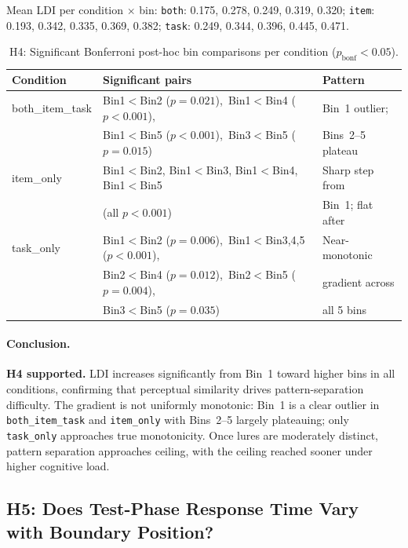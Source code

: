 \documentclass[10pt,a4paper]{article}
\begin{document}
Mean LDI per condition $\times$ bin: \texttt{both}: 0.175, 0.278, 0.249, 0.319, 0.320; \texttt{item}: 0.193, 0.342, 0.335, 0.369, 0.382; \texttt{task}: 0.249, 0.344, 0.396, 0.445, 0.471.

\begin{table}[H]
\centering
\caption{H4: Significant Bonferroni post-hoc bin comparisons per condition ($p_{\mathrm{bonf}} < 0.05$).}
\label{tab:h4posthoc}
\small
\begin{tabular}{lll}
\toprule
\textbf{Condition} & \textbf{Significant pairs} & \textbf{Pattern} \\
\midrule
both\_item\_task
  & Bin1$<$Bin2 ($p{=}0.021$),\ Bin1$<$Bin4 ($p{<}0.001$),
  & Bin~1 outlier; \\
  & Bin1$<$Bin5 ($p{<}0.001$),\ Bin3$<$Bin5 ($p{=}0.015$)
  & Bins~2--5 plateau \\[4pt]
item\_only
  & Bin1$<$Bin2, Bin1$<$Bin3, Bin1$<$Bin4, Bin1$<$Bin5
  & Sharp step from \\
  & (all $p{<}0.001$)
  & Bin~1; flat after \\[4pt]
task\_only
  & Bin1$<$Bin2 ($p{=}0.006$),\ Bin1$<$Bin3,4,5 ($p{<}0.001$),
  & Near-monotonic \\
  & Bin2$<$Bin4 ($p{=}0.012$),\ Bin2$<$Bin5 ($p{=}0.004$),
  & gradient across \\
  & Bin3$<$Bin5 ($p{=}0.035$)
  & all 5 bins \\
\bottomrule
\end{tabular}
\end{table}

\paragraph{Conclusion.}
\textbf{H4 supported.} LDI increases significantly from Bin~1 toward higher bins in all conditions, confirming that perceptual similarity drives pattern-separation difficulty. The gradient is not uniformly monotonic: Bin~1 is a clear outlier in \texttt{both\_item\_task} and \texttt{item\_only} with Bins~2--5 largely plateauing; only \texttt{task\_only} approaches true monotonicity. Once lures are moderately distinct, pattern separation approaches ceiling, with the ceiling reached sooner under higher cognitive load.

\subsection*{H5: Does Test-Phase Response Time Vary with Boundary Position?}
\end{document}
